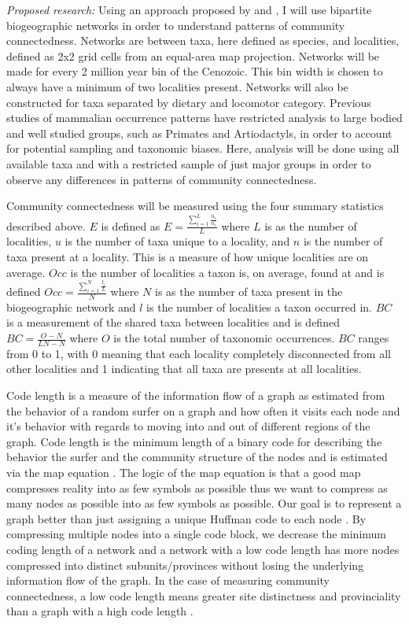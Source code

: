 \documentclass[12pt,letterpaper]{article}
\begin{document}
\textit{Proposed research:}
Using an approach proposed by \citet{Sidor2013} and \citet{Vilhena2013}, I will use bipartite biogeographic networks in order to understand patterns of community connectedness. Networks are between taxa, here defined as species, and localities, defined as 2x2 grid cells from an equal-area map projection. Networks will be made for every 2 million year bin of the Cenozoic. This bin width is chosen to always have a minimum of two localities present. Networks will also be constructed for taxa separated by dietary and locomotor category. Previous studies of mammalian occurrence patterns have restricted analysis to large bodied and well studied groups, such as Primates and Artiodactyls, in order to account for potential sampling and taxonomic biases. Here, analysis will be done using all available taxa and with a restricted sample of just major groups in order to observe any differences in patterns of community connectedness. 

Community connectedness will be measured using the four summary statistics described above. \(E\) is defined as 
\(
  E = \frac{\sum_{i = 1}^{L} \frac{u_{i}}{n_{i}}}{L}
\)
where \(L\) is as the number of localities, \(u\) is the number of taxa unique to a locality, and \(n\) is the number of taxa present at a locality. This is a measure of how unique localities are on average. \(Occ\) is the number of localities a taxon is, on average, found at and is defined
\(
  Occ = \frac{\sum_{i = 1}^{N} \frac{l_{i}}{L}}{N}
\)
where \(N\) is as the number of taxa present in the biogeographic network and \(l\) is the number of localities a taxon occurred in. \(BC\) is a measurement of the shared taxa between localities and is defined 
\(
  BC = \frac{O - N}{LN - N}
\)
where \(O\) is the total number of taxonomic occurrences. \(BC\) ranges from 0 to 1, with 0 meaning that each locality completely disconnected from all other localities and 1 indicating that all taxa are presents at all localities. 

Code length is a measure of the information flow \citep{Shannon1948} of a graph as estimated from the behavior of a random surfer \citep{Brin1998} on a graph and how often it visits each node and it's behavior with regards to moving into and out of different regions of the graph. Code length is the minimum length of a binary code for describing the behavior the surfer and the community structure of the nodes and is estimated via the map equation \citep{Rosvall2008,Rosvall2009a}. The logic of the map equation is that a good map compresses reality into as few symbols as possible thus we want to compress as many nodes as possible into as few symbols as possible. Our goal is to represent a graph better than just assigning a unique Huffman code to each node \citep{Huffman1952,Rosvall2008}. By compressing multiple nodes into a single code block, we decrease the minimum coding length of a network and a network with a low code length has more nodes compressed into distinct subunits/provinces without losing the underlying information flow of the graph. In the case of measuring community connectedness, a low code length means greater site distinctness and provinciality than a graph with a high code length \citep{Sidor2013}. 
\end{document}
